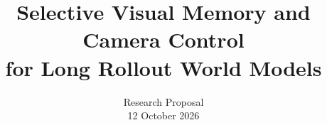 \documentclass[10pt,twocolumn,letterpaper]{article}
\title{Selective Visual Memory and Camera Control\\for Long Rollout World Models}
\author{Research Proposal\\\normalsize 12 October 2026}
\begin{document}
\maketitle













\FloatBarrier
{\small


}
\clearpage
\appendix

\end{document}
